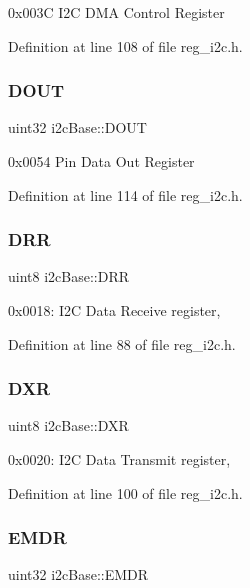 0x003C I2C D\+MA Control Register 

Definition at line 108 of file reg\+\_\+i2c.\+h.

\mbox{\label{structi2cBase_a753b427e74a41034269df54a860f2902}} 
\subsubsection{\texorpdfstring{D\+O\+UT}{DOUT}}
{\footnotesize\ttfamily uint32 i2c\+Base\+::\+D\+O\+UT}

0x0054 Pin Data Out Register 

Definition at line 114 of file reg\+\_\+i2c.\+h.

\mbox{\label{structi2cBase_aeb453c379b5d1f00d08474410894908a}} 
\subsubsection{\texorpdfstring{D\+RR}{DRR}}
{\footnotesize\ttfamily uint8 i2c\+Base\+::\+D\+RR}

0x0018\+: I2C Data Receive register, 

Definition at line 88 of file reg\+\_\+i2c.\+h.

\mbox{\label{structi2cBase_abe0cbe979728f5d402aefab15fc79c90}} 
\subsubsection{\texorpdfstring{D\+XR}{DXR}}
{\footnotesize\ttfamily uint8 i2c\+Base\+::\+D\+XR}

0x0020\+: I2C Data Transmit register, 

Definition at line 100 of file reg\+\_\+i2c.\+h.

\mbox{\label{structi2cBase_a2d5d0e354759ebcfbd3545a3304a5df8}} 
\subsubsection{\texorpdfstring{E\+M\+DR}{EMDR}}
{\footnotesize\ttfamily uint32 i2c\+Base\+::\+E\+M\+DR}

